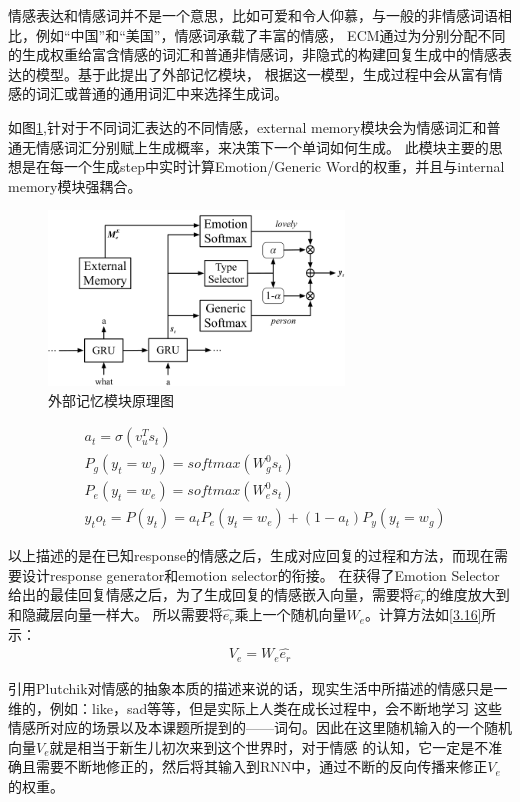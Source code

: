 \documentclass[supercite]{HustGraduPaper}
\theoremstyle{definition}
\begin{document}
情感表达和情感词并不是一个意思，比如可爱和令人仰慕，与一般的非情感词语相比，例如“中国”和“美国”，情感词承载了丰富的情感，
ECM通过为分别分配不同的生成权重给富含情感的词汇和普通非情感词，非隐式的构建回复生成中的情感表达的模型。基于此提出了外部记忆模块，
根据这一模型，生成过程中会从富有情感的词汇或普通的通用词汇中来选择生成词。

如图\ref{Fig.ememory},针对于不同词汇表达的不同情感，external memory模块会为情感词汇和普通无情感词汇分别赋上生成概率，来决策下一个单词如何生成。
此模块主要的思想是在每一个生成step中实时计算Emotion/Generic Word的权重，并且与internal memory模块强耦合。

\begin{figure}[H] %
  \centering %
  \includegraphics[width=0.7\textwidth]{images/ememory.png} %
  \caption{外部记忆模块原理图} %
  \label{Fig.ememory} %
\end{figure}

\begin{align}
  &a_t = \sigma(v_u^T s_t)\\
  &P_g(y_t = w_g) = softmax(W_g^0 s_t)\\
  &P_e(y_t = w_e) = softmax(W_e^0 s_t)\\
  &y_t o_t = P(y_t) = a_t P_e(y_t=w_e) + (1-a_t)P_y(y_t=w_g)
\end{align}

以上描述的是在已知response的情感之后，生成对应回复的过程和方法，而现在需要设计response generator和emotion selector的衔接。
在获得了Emotion Selector给出的最佳回复情感之后，为了生成回复的情感嵌入向量，需要将$\hat{e_r}$的维度放大到和隐藏层向量一样大。
所以需要将$\hat{e_r}$乘上一个随机向量$W_e$。计算方法如\ref{3.16}所示：
\begin{align}
  V_e = W_e \hat{e_r} \label{3.16} 
\end{align}

引用Plutchik\cite{plutchik1980general}对情感的抽象本质的描述来说的话，现实生活中所描述的情感只是一维的，例如：like，sad等等，但是实际上人类在成长过程中，会不断地学习
这些情感所对应的场景以及本课题所提到的——词句。因此在这里随机输入的一个随机向量$V_e$就是相当于新生儿初次来到这个世界时，对于情感
的认知，它一定是不准确且需要不断地修正的，然后将其输入到RNN中，通过不断的反向传播来修正$V_e$的权重。
\end{document}

